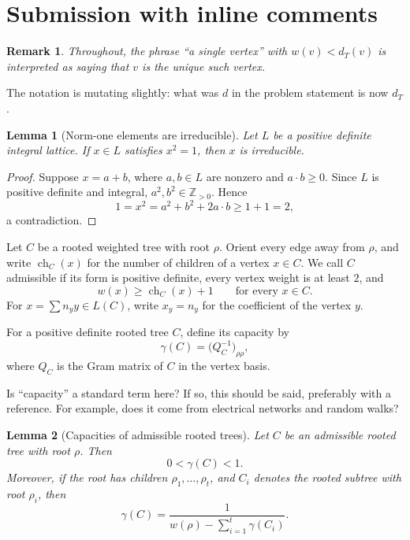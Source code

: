\documentclass[12pt]{article}
\newtheorem{lemma}{Lemma}
\newtheorem{remark}{Remark}
\DeclareMathOperator{\ch}{ch}
\newcommand{\review}[1]{\begin{reviewbox}#1\end{reviewbox}}
\begin{document}
  \section{Submission with inline comments}


\date{}



\begin{remark}
Throughout, the phrase ``a single vertex'' with \(w(v)<d_T(v)\) is interpreted as saying that \(v\) is the unique such vertex.
\end{remark}

\review{The notation is mutating slightly: what was $d$ in the problem statement is now $d_T$.}

\begin{lemma}[Norm-one elements are irreducible]
Let \(L\) be a positive definite integral lattice. If \(x\in L\) satisfies \(x^2=1\), then \(x\) is irreducible.
\end{lemma}

\begin{proof}
Suppose \(x=a+b\), where \(a,b\in L\) are nonzero and \(a\cdot b\ge 0\). Since \(L\) is positive definite and integral, \(a^2,b^2\in \mathbb Z_{>0}\). Hence
\[
1=x^2=a^2+b^2+2a\cdot b\ge 1+1=2,
\]
a contradiction.
\end{proof}

Let \(C\) be a rooted weighted tree with root \(\rho\). Orient every edge away from \(\rho\), and write \(\ch_C(x)\) for the number of children of a vertex \(x\in C\). We call \(C\) admissible if its form is positive definite, every vertex weight is at least \(2\), and
\[
w(x)\ge \ch_C(x)+1
\qquad \text{for every } x\in C.
\]
For \(x=\sum n_y y\in L(C)\), write \(x_y=n_y\) for the coefficient of the vertex \(y\).

For a positive definite rooted tree \(C\), define its capacity by
\[
\gamma(C)=\bigl(Q_C^{-1}\bigr)_{\rho\rho},
\]
where \(Q_C\) is the Gram matrix of \(C\) in the vertex basis.

\review{Is ``capacity'' a standard term here? If so, this should be said, preferably with a reference. For example, does it come from electrical networks and random walks?}

\begin{lemma}[Capacities of admissible rooted trees]
Let \(C\) be an admissible rooted tree with root \(\rho\). Then
\[
0<\gamma(C)<1.
\]
Moreover, if the root has children \(\rho_1,\dots,\rho_t\), and \(C_i\) denotes the rooted subtree with root \(\rho_i\), then
\[
\gamma(C)=\frac{1}{w(\rho)-\sum_{i=1}^t \gamma(C_i)}.
\]
\end{lemma}
\end{document}
